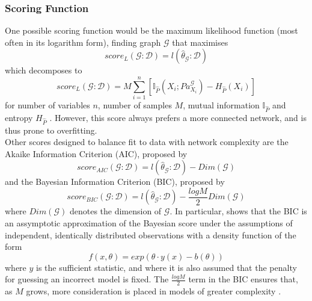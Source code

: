 \documentclass [11pt]{article}
\begin{document}
\subsubsection{Scoring Function}
One possible scoring function would be the maximum likelihood function (most often in its logarithm form), finding graph $\mathcal{G}$ that maximises
\begin{equation*}
score_{L}(\mathcal{G}:\mathcal{D}) = l(\hat{\theta}_{\mathcal{G}}:\mathcal{D})
\end{equation*}
which decomposes to
\begin{equation*}
score_{L}(\mathcal{G}:\mathcal{D}) = M\sum_{i=1}^{n}[\mathbb{I}_{\hat{P}}(X_{i};Pa_{X_{i}}^{\mathcal{G}})-H_{\hat{P}}(X_{i})]
\end{equation*}
for number of variables $n$, number of samples $M$, mutual information $\mathbb{I}_{\hat{P}}$ and entropy $H_{\hat{P}}$ \citep{koller09}. However, this score always prefers a more connected network, and is thus prone to overfitting.
\\
Other scores designed to balance fit to data with network complexity are the Akaike Information Criterion (AIC), proposed by \citet{akaike98}
\begin{equation*}
score_{AIC}(\mathcal{G}:\mathcal{D}) = l(\hat{\theta}_{\mathcal{G}}:\mathcal{D}) - Dim(\mathcal{G})
\end{equation*}
and the Bayesian Information Criterion (BIC), proposed by \citet{schwarz78}
\begin{equation*}
score_{BIC}(\mathcal{G}:\mathcal{D}) = l(\hat{\theta}_{\mathcal{G}}:\mathcal{D}) - \frac{logM}{2}Dim(\mathcal{G})
\end{equation*}
where $Dim(\mathcal{G})$ denotes the dimension of $\mathcal{G}$. In particular, \citet{schwarz78} shows that the BIC is an assymptotic approximation of the Bayesian score under the assumptions of independent, identically distributed observations with a density function of the form
\begin{equation*}
f(x,\theta) = exp(\theta \cdot y(x) - b(\theta))
\end{equation*}
where $y$ is the sufficient statistic, and where it is also assumed that the penalty for guessing an incorrect model is fixed. The $\frac{logM}{2}$ term in the BIC ensures that, as $M$ grows, more consideration is placed in models of greater complexity \citep{koller09}.
\end{document}
